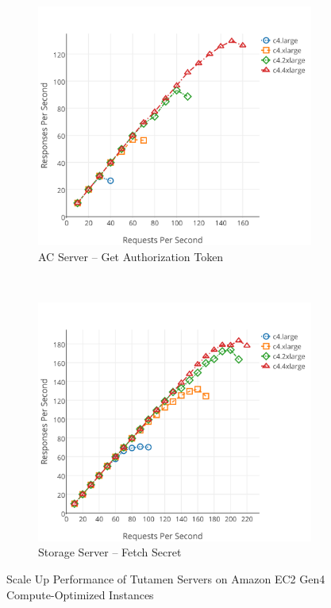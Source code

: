 \begin{figure}[thb]
  \centering
  \begin{subfigure}[t]{0.48\textwidth}
    \includegraphics[width=\textwidth]{./figs/png/get_ac_auth_comp_chart.png}
    \caption{AC Server -- Get Authorization Token}
    \label{fig:eval:scaleup:gettoken}
  \end{subfigure}
  ~
  \begin{subfigure}[t]{0.48\textwidth}
    \includegraphics[width=\textwidth]{./figs/png/get_ss_secret_comp_chart.png}
    \caption{Storage Server -- Fetch Secret}
    \label{fig:eval:scaleup:getsecret}
  \end{subfigure}
  \caption{Scale Up Performance of Tutamen Servers on Amazon EC2 Gen4
    Compute-Optimized Instances}
  \label{fig:eval:scaleup}
\end{figure}


